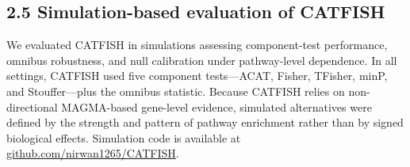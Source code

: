 \documentclass[unnumsec,webpdf,contemporary,large]{oup-authoring-template}%
\theoremstyle{thmstyleone}%
\theoremstyle{thmstyletwo}%
\theoremstyle{thmstylethree}%
\begin{document}


\subsection*{2.5 Simulation-based evaluation of CATFISH}

We evaluated CATFISH in simulations assessing component-test performance, omnibus robustness, and null calibration under pathway-level dependence. In all settings, CATFISH used five component tests---ACAT, Fisher, TFisher, minP, and Stouffer---plus the omnibus statistic. Because CATFISH relies on non-directional MAGMA-based gene-level evidence, simulated alternatives were defined by the strength and pattern of pathway enrichment rather than by signed biological effects. Simulation code is available at \href{https://github.com/nirwan1265/CATFISH}{github.com/nirwan1265/CATFISH}. 
\end{document}
